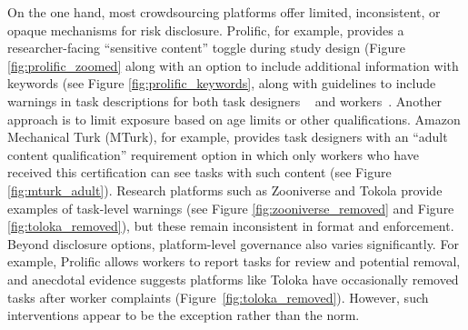 On the one hand, most crowdsourcing platforms offer limited, inconsistent, or opaque mechanisms for risk disclosure. %
Prolific, for example, provides a researcher-facing ``sensitive content'' toggle during study design (Figure \ref{fig:prolific_zoomed} along with an option to include additional information with keywords (see Figure \ref{fig:prolific_keywords}, along with guidelines to include warnings in task descriptions for both task designers ~\cite{ProlificResearcherSensitive2025, ProlificAPIContentWarning2025} and workers~\cite{prolific2025participant}. Another approach is to limit exposure based on age limits or other qualifications. Amazon Mechanical Turk (MTurk), for example, provides task designers with an ``adult content qualification'' requirement option in which only workers who have received this certification can see tasks with such content (see Figure \ref{fig:mturk_adult}). Research platforms such as Zooniverse and Tokola provide examples of task-level warnings (see Figure \ref{fig:zooniverse_removed} and Figure \ref{fig:toloka_removed}), but these remain inconsistent in format and enforcement.
Beyond disclosure options, platform-level governance also varies significantly. %
For example, Prolific allows workers to report tasks for review and potential removal, and anecdotal evidence suggests platforms like Toloka have occasionally removed tasks after worker complaints (Figure~\ref{fig:toloka_removed}). However, such interventions appear to be the exception rather than the norm.

